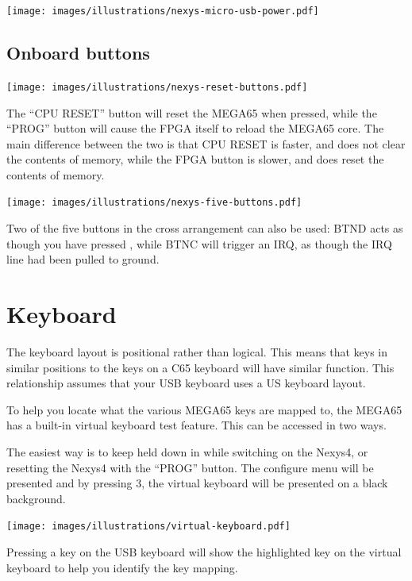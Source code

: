 \texttt{[image: images/illustrations/nexys-micro-usb-power.pdf]}

\subsection{Onboard buttons}

\begin{center}
  \texttt{[image: images/illustrations/nexys-reset-buttons.pdf]}
\end{center}

The ``CPU RESET'' button will reset the MEGA65 when pressed, while the ``PROG'' button will cause the FPGA itself to reload the MEGA65
core.  The main difference between the two is that CPU RESET is faster, and does not clear the contents of memory, while the FPGA button
is slower, and does reset the contents of memory.

\begin{center}
  \texttt{[image: images/illustrations/nexys-five-buttons.pdf]}
\end{center}

Two of the five buttons in the cross arrangement can also be used:  BTND acts as though you have pressed , while BTNC will trigger an IRQ, as though the IRQ line had been pulled to ground.

\section{Keyboard}

The keyboard layout is positional rather than logical.
This means that keys in similar positions to the keys on a C65 keyboard will have similar function.
This relationship assumes that your USB keyboard uses a US keyboard layout.

To help you locate what the various MEGA65 keys are mapped to, the MEGA65 has a built-in virtual keyboard test feature. This can be accessed in two ways.

The easiest way is to keep  held down in while switching on the Nexys4, or resetting the Nexys4 with
the ``PROG'' button. The configure menu will be presented and by pressing 3, the virtual keyboard will be presented on a black background.

\texttt{[image: images/illustrations/virtual-keyboard.pdf]}

Pressing a key on the USB keyboard will show the highlighted key on the virtual keyboard to help you identify the key mapping.


